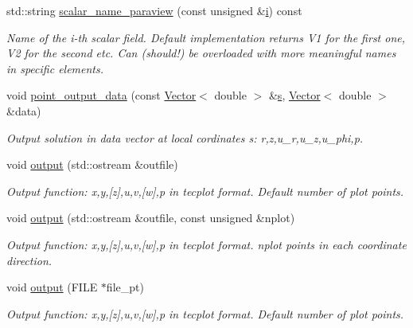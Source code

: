 \begin{DoxyCompactItemize}
std\+::string \hyperlink{classoomph_1_1AxisymmetricNavierStokesEquations_a44ffef8f80dd1419fd6a7b281e2185b3}{scalar\+\_\+name\+\_\+paraview} (const unsigned \&\hyperlink{cfortran_8h_adb50e893b86b3e55e751a42eab3cba82}{i}) const
\begin{DoxyCompactList}\small\item\em Name of the i-\/th scalar field. Default implementation returns V1 for the first one, V2 for the second etc. Can (should!) be overloaded with more meaningful names in specific elements. \end{DoxyCompactList}\item 
void \hyperlink{classoomph_1_1AxisymmetricNavierStokesEquations_a011b01b75649aaeba4cf759ba5e4b9e8}{point\+\_\+output\+\_\+data} (const \hyperlink{classoomph_1_1Vector}{Vector}$<$ double $>$ \&\hyperlink{cfortran_8h_ab7123126e4885ef647dd9c6e3807a21c}{s}, \hyperlink{classoomph_1_1Vector}{Vector}$<$ double $>$ \&data)
\begin{DoxyCompactList}\small\item\em Output solution in data vector at local cordinates s\+: r,z,u\+\_\+r,u\+\_\+z,u\+\_\+phi,p. \end{DoxyCompactList}\item 
void \hyperlink{classoomph_1_1AxisymmetricNavierStokesEquations_afe0c7b607ec3fd03a73b7db4f1fe6252}{output} (std\+::ostream \&outfile)
\begin{DoxyCompactList}\small\item\em Output function\+: x,y,\mbox{[}z\mbox{]},u,v,\mbox{[}w\mbox{]},p in tecplot format. Default number of plot points. \end{DoxyCompactList}\item 
void \hyperlink{classoomph_1_1AxisymmetricNavierStokesEquations_a94a243ca05ba3b995e366564e6cf7695}{output} (std\+::ostream \&outfile, const unsigned \&nplot)
\begin{DoxyCompactList}\small\item\em Output function\+: x,y,\mbox{[}z\mbox{]},u,v,\mbox{[}w\mbox{]},p in tecplot format. nplot points in each coordinate direction. \end{DoxyCompactList}\item 
void \hyperlink{classoomph_1_1AxisymmetricNavierStokesEquations_a61129dd7505ac363862946bd8b3ea5bf}{output} (F\+I\+LE $\ast$file\+\_\+pt)
\begin{DoxyCompactList}\small\item\em Output function\+: x,y,\mbox{[}z\mbox{]},u,v,\mbox{[}w\mbox{]},p in tecplot format. Default number of plot points. \end{DoxyCompactList}\item 

\end{DoxyCompactItemize}
